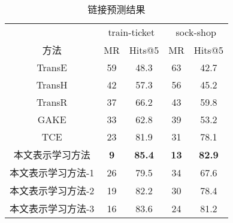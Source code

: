 \begin{table}[htbp]
    \caption{链接预测结果}
    \centering
    \label{link-predict-result}
    \begin{tabular}{ccccc}
    \toprule[2pt]
           & \multicolumn{2}{c}{train-ticket} & \multicolumn{2}{c}{sock-shop} \\
    方法     & MR            & Hits@5           & MR           & Hits@5         \\ \midrule[2pt]
    TransE & 59            & 48.3             & 63           & 42.7           \\
    TransH & 42            & 57.3             & 56           & 45.2           \\
    TransR & 37            & 66.2             & 43           & 59.8           \\
    GAKE   & 33            & 62.8             & 39           & 53.2           \\
    TCE    & 23            & 81.9             & 31           & 78.1           \\
    本文表示学习方法   & \textbf{9}    & \textbf{85.4}    & \textbf{13}  & \textbf{82.9}  \\
    本文表示学习方法-1 & 26            & 79.5             & 34           & 67.6         \\ 
    本文表示学习方法-2 & 19           & 82.2             & 30           & 78.4           \\ 
    本文表示学习方法-3 & 16            & 83.6            & 24           & 81.2          \\ 
    \bottomrule[2pt]
    \end{tabular}
\end{table}

